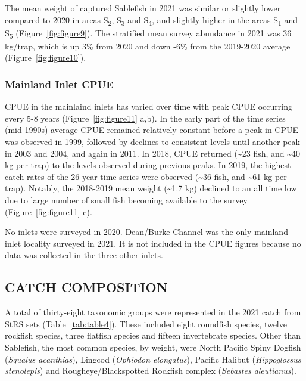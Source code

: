 \documentclass[12pt]{article}\usepackage[]{graphicx}\usepackage[]{color}
\begin{document}
The mean weight of captured Sablefish in 2021 was similar or slightly lower compared to 2020 in areas S\textsubscript{2}, S\textsubscript{3} and S\textsubscript{4}, and slightly higher in the areas S\textsubscript{1} and S\textsubscript{5} (Figure~\ref{fig:figure9}). The stratified mean survey abundance in 2021 was 36 kg/trap, which is up 3\% from 2020 and down -6\% from the 2019-2020 average (Figure~\ref{fig:figure10}).

\hypertarget{mainland-inlet-cpue}{%
\subsubsection{Mainland Inlet CPUE}\label{mainland-inlet-cpue}}

CPUE in the mainlaind inlets has varied over time with peak CPUE occurring every 5-8 years (Figure~\ref{fig:figure11} a,b). In the early part of the time series (mid-1990s) average CPUE remained relatively constant before a peak in CPUE was observed in 1999, followed by declines to consistent levels until another peak in 2003 and 2004, and again in 2011. In 2018, CPUE returned (\textasciitilde23 fish, and \textasciitilde40 kg per trap) to the levels observed during previous peaks. In 2019, the highest catch rates of the 26 year time series were observed (\textasciitilde36 fish, and \textasciitilde61 kg per trap). Notably, the 2018-2019 mean weight (\textasciitilde1.7 kg) declined to an all time low due to large number of small fish becoming available to the survey (Figure~\ref{fig:figure11} c).

No inlets were surveyed in 2020. Dean/Burke Channel was the only mainland inlet locality surveyed in 2021. It is not included in the CPUE figures because no data was collected in the three other inlets.

\hypertarget{catch-composition}{%
\subsection{CATCH COMPOSITION}\label{catch-composition}}

A total of thirty-eight taxonomic groups were represented in the 2021 catch from StRS sets (Table~\ref{tab:table4}). These included eight roundfish species, twelve rockfish species, three flatfish species and fifteen invertebrate species. Other than Sablefish, the most common species, by weight, were North Pacific Spiny Dogfish (\emph{Squalus acanthias}), Lingcod (\emph{Ophiodon elongatus}), Pacific Halibut (\emph{Hippoglossus stenolepis}) and Rougheye/Blackspotted Rockfish complex (\emph{Sebastes aleutianus}).
\end{document}
